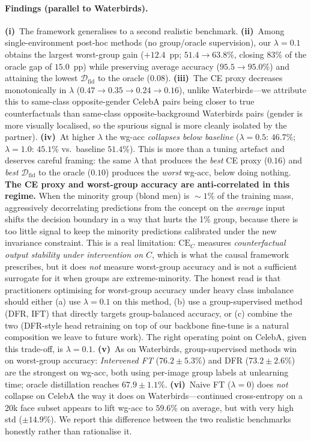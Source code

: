 \documentclass{article}
\newcommand{\CE}{\mathrm{CE}}
\newcommand{\Dfid}{\mathcal{D}_{\mathrm{fid}}}
\begin{document}
\paragraph{Findings (parallel to Waterbirds).}
\textbf{(i)}~The framework generalises to a second realistic benchmark.
\textbf{(ii)}~Among single-environment post-hoc methods (no group/oracle
supervision), our $\lambda{=}0.1$ obtains the largest worst-group gain
($+12.4$~pp; $51.4\!\to\!63.8\%$, closing $83\%$ of the oracle gap of
$15.0$~pp) while preserving average accuracy ($95.5\!\to\!95.0\%$) and
attaining the lowest $\Dfid$ to the oracle ($0.08$).
\textbf{(iii)}~The CE proxy decreases monotonically in $\lambda$
($0.47 \!\to\! 0.35 \!\to\! 0.24 \!\to\! 0.16$), unlike Waterbirds---we
attribute this to same-class opposite-gender CelebA pairs being closer to
true counterfactuals than same-class opposite-background Waterbirds pairs
(gender is more visually localised, so the spurious signal is more cleanly
isolated by the partner).
\textbf{(iv)}~At higher $\lambda$ the wg-acc \emph{collapses below baseline}
($\lambda{=}0.5$: $46.7\%$; $\lambda{=}1.0$: $45.1\%$ vs.\ baseline $51.4\%$).
This is more than a tuning artefact and deserves
careful framing: the same $\lambda$ that produces the
\emph{best} CE proxy ($0.16$) and \emph{best} $\Dfid$ to the oracle ($0.10$)
produces the \emph{worst} wg-acc, below doing nothing.
\textbf{The CE proxy and worst-group accuracy are anti-correlated in this
regime.}  When the minority group (blond men) is $\!\sim\!1\%$ of the training
mass, aggressively decorrelating predictions from the concept on the
\emph{average} input shifts the decision boundary in a way that hurts the
1\% group, because there is too little signal to keep the minority predictions
calibrated under the new invariance constraint.  This is a real limitation:
$\CE_C$ measures \emph{counterfactual output stability under intervention on
$C$}, which is what the causal framework prescribes, but it does \emph{not}
measure worst-group accuracy and is not a sufficient surrogate for it when
groups are extreme-minority.  The honest read is that practitioners
optimising for worst-group accuracy under heavy class imbalance should
either (a) use $\lambda{=}0.1$ on this method, (b) use a group-supervised
method (DFR, IFT) that directly targets group-balanced accuracy, or (c)
combine the two (DFR-style head retraining on top of our backbone fine-tune
is a natural composition we leave to future work).
The right operating point on CelebA, given this trade-off, is
$\lambda{=}0.1$.
\textbf{(v)}~As on Waterbirds, group-supervised methods win on worst-group
accuracy: \emph{Intervened FT} ($76.2 \pm 5.3\%$) and DFR
($73.2 \pm 2.6\%$) are the strongest on wg-acc, both using per-image group
labels at unlearning time; oracle distillation reaches $67.9 \pm 1.1\%$.
\textbf{(vi)}~Naive FT ($\lambda{=}0$) does \emph{not} collapse on CelebA the
way it does on Waterbirds---continued cross-entropy on a 20k face subset
appears to lift wg-acc to $59.6\%$ on average, but with very high std
($\pm 14.9\%$).  We report this difference between the two realistic
benchmarks honestly rather than rationalise it.
\end{document}
